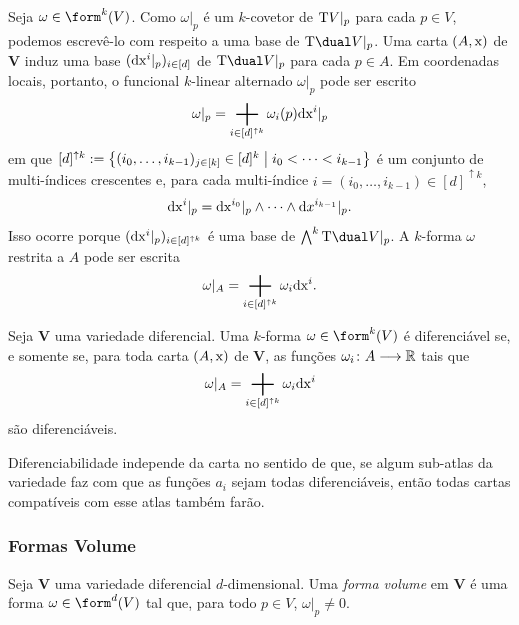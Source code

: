 Seja $\omega \in \form^k(V)$. Como $\omega|_p$ é um $k$-covetor de $\mathrm{T} V|_p$ para cada $p \in V$, podemos escrevê-lo com respeito a uma base de $\Tg\dual V|_p$. Uma carta $(A,\mathrm{x})$ de $\bm V$ induz uma base $(\mathrm{d}\mathrm{x}^i|_p)_{i \in [d]}$ de $\Tg\dual V|_p$ para cada $p \in A$. Em coordenadas locais, portanto, o funcional $k$-linear alternado $\omega|_p$ pode ser escrito
	\begin{equation*}
	\omega|_p = \sum_{i \in [d]^{\uparrow k}} \omega_i(p) \dd\x^i|_p
	\end{equation*}
em que $[d]^{\uparrow k} := \left\{(i_0,\ldots,i_{k-1})_{j \in [k]} \in [d]^k \;\middle\vert\; i_0<\cdots<i_{k-1} \right\}$ é um conjunto de multi-índices crescentes e, para cada multi-índice $i=(i_0,\ldots,i_{k-1}) \in [d]^{\uparrow k}$,
	\begin{equation*}
	\mathrm{d}\mathrm{x}^i|_p = \mathrm{d}\mathrm{x}^{i_0}|_p \wedge \cdots \wedge \mathrm{d} x^{i_{k-1}}|_p.
	\end{equation*}
Isso ocorre porque $(\mathrm{d}\mathrm{x}^i|_p)_{i \in [d]^{\uparrow k}}$ é uma base de $\bigwedge^k\Tg\dual V|_p$. A $k$-forma $\omega$ restrita a $A$ pode ser escrita
	\begin{equation*}
	\omega|_A = \sum_{i \in [d]^{\uparrow k}} \omega_i \dd\x^i.
	\end{equation*}

\begin{prop}
Seja $\bm V$ uma variedade diferencial. Uma $k$-forma $\omega \in \form^k(V)$ é diferenciável se, e somente se, para toda carta $(A,\mathrm{x})$ de $\bm V$, as funções $\omega_i\colon A \longrightarrow \mathbb{R}$ tais que
	\begin{equation*}
	\omega|_A = \sum_{i \in [d]^{\uparrow k}} \omega_i \dd\x^i
	\end{equation*}
são diferenciáveis.
\end{prop}

Diferenciabilidade independe da carta no sentido de que, se algum sub-atlas da variedade faz com que as funções $a_i$ sejam todas diferenciáveis, então todas cartas compatíveis com esse atlas também farão.

\subsubsection{Formas Volume}

\begin{defi}
Seja $\bm V$ uma variedade diferencial $d$-dimensional. Uma \emph{forma volume} em $\bm V$ é uma forma $\omega \in \form^d (V)$ tal que, para todo $p \in V$, $\omega|_p \neq 0$.
\end{defi}


